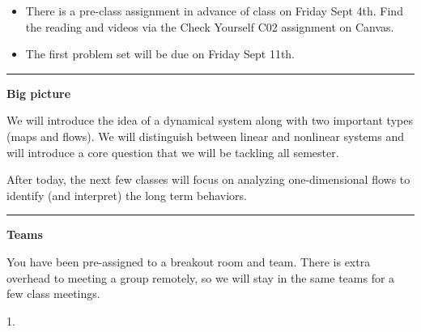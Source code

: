 \documentclass[12pt,letterpaper,noanswers]{exam}
\begin{document}








\begin{itemize}
\itemsep0em
\item There is a pre-class assignment in advance of class on Friday Sept 4th.  Find the reading and videos via the Check Yourself C02 assignment on Canvas.
\item The first problem set will be due on Friday Sept 11th. 
\end{itemize}

\hrule
\vspace{0.2cm}


\noindent\textbf{Big picture}

We will introduce the idea of a dynamical system along with two important types (maps and flows).  We will distinguish between linear and nonlinear systems and will introduce a core question that we will be tackling all semester.

After today, the next few classes will focus on analyzing one-dimensional flows to identify (and interpret) the long term behaviors.

\vspace{0.2cm}
\hrule
\vspace{0.2cm}

\noindent\textbf{Teams}

You have been pre-assigned to a breakout room and team.  There is extra overhead to meeting a group remotely, so we will stay in the same teams for a few class meetings.

\begin{multicols}{2}
1. 
\end{multicols}
\end{document}
